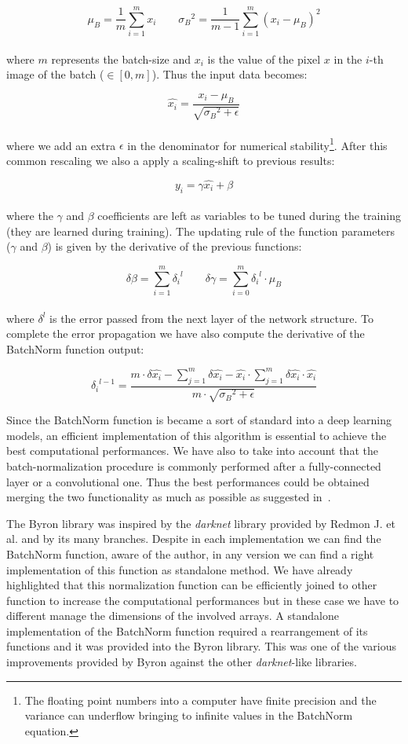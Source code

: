 \documentclass{standalone}
\begin{document}
$$
\mu_B = \frac{1}{m}\sum_{i=1}^{m}x_i \quad\quad {\sigma_B}^2 = \frac{1}{m-1}\sum_{i=1}^{m}(x_i - \mu_B)^2
$$
\\
where $m$ represents the batch-size and $x_i$ is the value of the pixel $x$ in the $i$-th image of the batch ($\in[0, m]$).
Thus the input data becomes:

$$
\hat{x_i} = \frac{x_i - \mu_B}{\sqrt{{\sigma_B}^2 + \epsilon}}
$$
\\
where we add an extra $\epsilon$ in the denominator for numerical stability\footnote{
  The floating point numbers into a computer have finite precision and the variance can underflow bringing to infinite values in the BatchNorm equation.
}.
After this common rescaling we also a apply a scaling-shift to previous results:

$$
y_i = \gamma\hat{x_i} + \beta
$$
\\
where the $\gamma$ and $\beta$ coefficients are left as variables to be tuned during the training (they are learned during training).
The updating rule of the function parameters ($\gamma$ and $\beta$) is given by the derivative of the previous functions:

$$
\delta\beta = \sum_{i=1}^{m}{\delta_i}^l \quad\quad \delta\gamma = \sum_{i=0}^{m} {\delta_i}^l \cdot \mu_B
$$
\\
where $\delta^l$ is the error passed from the next layer of the network structure.
To complete the error propagation we have also compute the derivative of the BatchNorm function output:

$$
{\delta_i}^{l-1} = \frac{{m}\cdot \delta\hat{x_i} - \sum_{j=1}^{m}\delta\hat{x_i} - \hat{x_i} \cdot \sum_{j=1}^{m} \delta\hat{x_i} \cdot \hat{x_i}}{m \cdot \sqrt{{\sigma_B}^2 + \epsilon} }
$$

Since the BatchNorm function is became a sort of standard into a deep learning models, an efficient implementation of this algorithm is essential to achieve the best computational performances.
We have also to take into account that the batch-normalization procedure is commonly performed after a fully-connected layer or a convolutional one.
Thus the best performances could be obtained merging the two functionality as much as possible as suggested in~\cite{AlexeyAB}.

The Byron library was inspired by the \emph{darknet} library provided by Redmon J. et al. and by its many branches.
Despite in each implementation we can find the BatchNorm function, aware of the author, in any version we can find a right implementation of this function as standalone method.
We have already highlighted that this normalization function can be efficiently joined to other function to increase the computational performances but in these case we have to different manage the dimensions of the involved arrays.
A standalone implementation of the BatchNorm function required a rearrangement of its functions and it was provided into the Byron library.
This was one of the various improvements provided by Byron against the other \emph{darknet}-like libraries.
\end{document}
